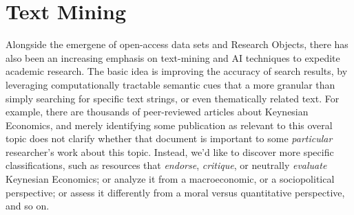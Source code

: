 
\section{Text Mining}\fbeg{}\begin{frame}{}

\begin{ftxt}[.88\textwidth]

Alongside the emergene of open-access data sets and Research Objects, 
there has also been an increasing emphasis on text-mining and AI 
techniques to expedite academic research.  The basic idea is 
improving the accuracy of search results, by leveraging computationally 
tractable semantic cues that a more granular than simply 
searching for specific text strings, or even thematically 
related text.  For example, there are thousands of 
peer-reviewed articles about Keynesian Economics, and 
merely identifying some publication as relevant to this 
overal topic does not clarify 
whether that document is important to some 
\textit{particular} researcher's work about this topic.
Instead, we'd like to discover more specific classifications, 
such as resources that \textit{endorse}, \textit{critique}, 
or neutrally \textit{evaluate} Keynesian Economics; or 
analyze it from a macroeconomic, or a sociopolitical 
perspective; or assess it differently from a moral 
versus quantitative perspective, and so on. 

\end{ftxt}

\end{frame}

